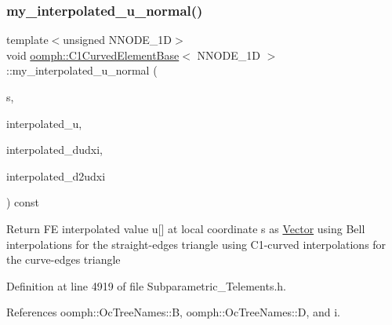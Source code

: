 \subsubsection{\texorpdfstring{my\+\_\+interpolated\+\_\+u\+\_\+normal()}{my\_interpolated\_u\_normal()}}
{\footnotesize\ttfamily template$<$unsigned N\+N\+O\+D\+E\+\_\+1D$>$ \\
void \hyperlink{classoomph_1_1C1CurvedElementBase}{oomph\+::\+C1\+Curved\+Element\+Base}$<$ N\+N\+O\+D\+E\+\_\+1D $>$\+::my\+\_\+interpolated\+\_\+u\+\_\+normal (\begin{DoxyParamCaption}\item[{const \hyperlink{classoomph_1_1Vector}{Vector}$<$ double $>$}]{s,  }\item[{\hyperlink{classoomph_1_1Vector}{Vector}$<$ double $>$ \&}]{interpolated\+\_\+u,  }\item[{\hyperlink{classoomph_1_1DenseMatrix}{Dense\+Matrix}$<$ double $>$ \&}]{interpolated\+\_\+dudxi,  }\item[{\hyperlink{classoomph_1_1DenseMatrix}{Dense\+Matrix}$<$ double $>$ \&}]{interpolated\+\_\+d2udxi }\end{DoxyParamCaption}) const\hspace{0.3cm}{\ttfamily [inline]}}

Return FE interpolated value u\mbox{[}\mbox{]} at local coordinate s as \hyperlink{classoomph_1_1Vector}{Vector} using Bell interpolations for the straight-\/edges triangle using C1-\/curved interpolations for the curve-\/edges triangle 

Definition at line 4919 of file Subparametric\+\_\+\+Telements.\+h.



References oomph\+::\+Oc\+Tree\+Names\+::B, oomph\+::\+Oc\+Tree\+Names\+::D, and i.

\mbox{\label{classoomph_1_1C1CurvedElementBase_a909d924bec591390020dbcfe5c0d3e0e}} 
